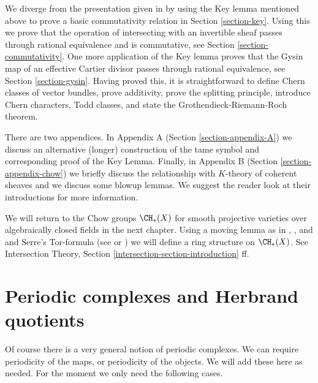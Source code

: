 \medskip\noindent
We diverge from the presentation given in \cite{F} by using the
Key lemma mentioned above to prove a basic commutativity relation in
Section \ref{section-key}. Using this we prove that the operation
of intersecting with an invertible sheaf passes through rational
equivalence and is commutative, see Section \ref{section-commutativity}.
One more application of the Key
lemma proves that the Gysin map of an effective Cartier divisor
passes through rational equivalence, see Section \ref{section-gysin}.
Having proved this, it is straightforward to define Chern
classes of vector bundles, prove additivity, prove the splitting principle,
introduce Chern characters, Todd classes, and state the
Grothendieck-Riemann-Roch theorem.

\medskip\noindent
There are two appendices. In Appendix A (Section \ref{section-appendix-A})
we discuss an alternative (longer) construction of the
tame symbol and corresponding proof of the Key Lemma.
Finally, in Appendix B (Section \ref{section-appendix-chow})
we briefly discuss the relationship with $K$-theory of coherent
sheaves and we discuss some blowup lemmas.
We suggest the reader look at their introductions for
more information.

\medskip\noindent
We will return to the Chow groups $\CH_*(X)$ for smooth projective varieties
over algebraically closed fields in the next chapter. Using a moving
lemma as in \cite{Samuel}, \cite{ChevalleyI}, and \cite{ChevalleyII}
and Serre's Tor-formula
(see \cite{Serre_local_algebra} or \cite{Serre_algebre_locale})
we will define a ring structure on $\CH_*(X)$. See
Intersection Theory, Section \ref{intersection-section-introduction} ff.








\section{Periodic complexes and Herbrand quotients}
\label{section-periodic-complexes}

\noindent
Of course there is a very general notion of periodic complexes.
We can require periodicity of the maps, or periodicity of the objects.
We will add these here as needed. For the moment we only need
the following cases.

